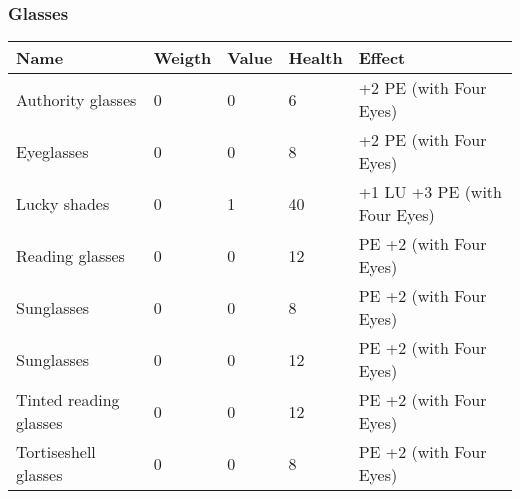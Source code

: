 
\subsubsection{Glasses}
\begin{longtable}{|p{4cm}|p{1.2cm}|p{1.2cm}|p{1.2cm}|p{6.3cm}|}
\hline
\bfseries Name & \bfseries Weigth & \bfseries Value & \bfseries Health & \bfseries Effect \\
\hline
\endhead
Authority glasses & 0 & 0 & 6 & +2 PE (with Four Eyes) \\
Eyeglasses & 0 & 0 & 8 & +2 PE (with Four Eyes) \\
Lucky shades & 0 & 1 & 40 &  +1 LU +3 PE (with Four Eyes) \\
Reading glasses & 0 & 0 & 12 & PE +2 (with Four Eyes) \\
Sunglasses & 0 & 0 & 8 & PE +2 (with Four Eyes) \\
Sunglasses & 0 & 0 & 12 & PE +2 (with Four Eyes) \\
Tinted reading glasses & 0 & 0 & 12 & PE +2 (with Four Eyes) \\
Tortiseshell glasses & 0 & 0 & 8 & PE +2 (with Four Eyes) \\
\hline
\end{longtable}
